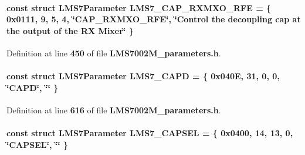 \paragraph[{L\+M\+S7\+\_\+\+C\+A\+P\+\_\+\+R\+X\+M\+X\+O\+\_\+\+R\+FE}]{\setlength{\rightskip}{0pt plus 5cm}const struct {\bf L\+M\+S7\+Parameter} L\+M\+S7\+\_\+\+C\+A\+P\+\_\+\+R\+X\+M\+X\+O\+\_\+\+R\+FE = \{ 0x0111, 9, 5, 4, \char`\"{}\+C\+A\+P\+\_\+\+R\+X\+M\+X\+O\+\_\+\+R\+F\+E\char`\"{}, \char`\"{}\+Control the decoupling cap at the output of the R\+X Mixer\char`\"{} \}\hspace{0.3cm}{\ttfamily [static]}}\label{LMS7002M__parameters_8h_a186e1a5e8b93ce3194f8928276a0b91d}


Definition at line {\bf 450} of file {\bf L\+M\+S7002\+M\+\_\+parameters.\+h}.

\paragraph[{L\+M\+S7\+\_\+\+C\+A\+PD}]{\setlength{\rightskip}{0pt plus 5cm}const struct {\bf L\+M\+S7\+Parameter} L\+M\+S7\+\_\+\+C\+A\+PD = \{ 0x040\+E, 31, 0, 0, \char`\"{}\+C\+A\+P\+D\char`\"{}, \char`\"{}\char`\"{} \}\hspace{0.3cm}{\ttfamily [static]}}\label{LMS7002M__parameters_8h_ad2579a6f538062dad492a37e275120be}


Definition at line {\bf 616} of file {\bf L\+M\+S7002\+M\+\_\+parameters.\+h}.

\paragraph[{L\+M\+S7\+\_\+\+C\+A\+P\+S\+EL}]{\setlength{\rightskip}{0pt plus 5cm}const struct {\bf L\+M\+S7\+Parameter} L\+M\+S7\+\_\+\+C\+A\+P\+S\+EL = \{ 0x0400, 14, 13, 0, \char`\"{}\+C\+A\+P\+S\+E\+L\char`\"{}, \char`\"{}\char`\"{} \}\hspace{0.3cm}{\ttfamily [static]}}\label{LMS7002M__parameters_8h_a8506c69fbb9ef119a77511b2f021e2f6}


